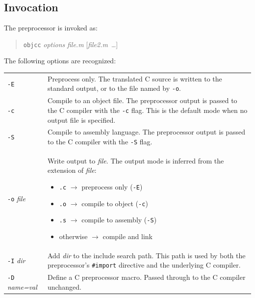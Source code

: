\documentclass[11pt,twoside]{article}
\newcommand{\meta}[1]{{\itshape #1}}
\begin{document}
\subsection{Invocation}

The preprocessor is invoked as:
\begin{quote}
{\tt objcc} {\meta{options}} {\meta{file.m}} [{\meta{file2.m}~\ldots}]
\end{quote}

The following options are recognized:

\medskip
\noindent
\begin{tabularx}{\textwidth}{lX}
{\tt -E} & Preprocess only.  The translated C source is written to the
           standard output, or to the file named by {\tt -o}. \\[4pt]
{\tt -c} & Compile to an object file.  The preprocessor output is
           passed to the C compiler with the {\tt -c} flag.  This is
           the default mode when no output file is specified. \\[4pt]
{\tt -S} & Compile to assembly language.  The preprocessor output is
           passed to the C compiler with the {\tt -S} flag. \\[4pt]
{\tt -o} {\meta{file}}
         & Write output to {\meta{file}}.  The output mode is inferred
           from the extension of {\meta{file}}:
           \begin{itemize}
             \setlength{\itemsep}{0pt}
             \setlength{\parskip}{0pt}
             \item {\tt .c} $\rightarrow$ preprocess only ({\tt -E})
             \item {\tt .o} $\rightarrow$ compile to object ({\tt -c})
             \item {\tt .s} $\rightarrow$ compile to assembly ({\tt -S})
             \item otherwise $\rightarrow$ compile and link
           \end{itemize} \\[4pt]
{\tt -I} {\meta{dir}}
         & Add {\meta{dir}} to the include search path.  This path is
           used by both the preprocessor's {\tt \#import} directive and
           the underlying C compiler. \\[4pt]
{\tt -D} {\meta{name=val}}
         & Define a C preprocessor macro.  Passed through to the C
           compiler unchanged. \\[4pt]

\end{tabularx}
\end{document}
